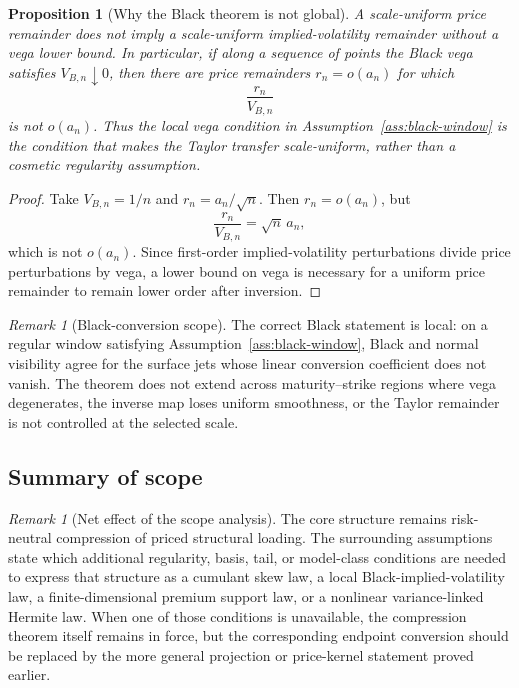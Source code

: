 \documentclass[11pt,a4paper]{amsart}
\theoremstyle{plain}
\newtheorem{proposition}[theorem]{Proposition}
\theoremstyle{definition}
\theoremstyle{remark}
\newtheorem{remark}[theorem]{Remark}
\begin{document}
\begin{proposition}[Why the Black theorem is not global]
\label{prop:black-not-global}
A scale-uniform price remainder does not imply a scale-uniform implied-volatility remainder without
a vega lower bound.  In particular, if along a sequence of points the Black vega satisfies
\(V_{B,n}\downarrow0\), then there are price remainders \(r_n=o(a_n)\) for which
\[
        \frac{r_n}{V_{B,n}}
\]
is not \(o(a_n)\).  Thus the local vega condition in Assumption~\ref{ass:black-window} is the
condition that makes the Taylor transfer scale-uniform, rather than a cosmetic regularity
assumption.
\end{proposition}

\begin{proof}
Take \(V_{B,n}=1/n\) and \(r_n=a_n/\sqrt n\).  Then \(r_n=o(a_n)\), but
\[
        \frac{r_n}{V_{B,n}}=\sqrt n\,a_n,
\]
which is not \(o(a_n)\).  Since first-order implied-volatility perturbations divide price
perturbations by vega, a lower bound on vega is necessary for a uniform price remainder to remain
lower order after inversion.
\end{proof}

\begin{remark}[Black-conversion scope]
\label{rem:black-conversion-scope-developed}
The correct Black statement is local: on a regular window satisfying Assumption~\ref{ass:black-window}, Black and normal visibility
agree for the surface jets whose linear conversion coefficient does not vanish.  The theorem does
not extend across maturity--strike regions where vega degenerates, the inverse map loses uniform
smoothness, or the Taylor remainder is not controlled at the selected scale.
\end{remark}

\subsection{Summary of scope}

\begin{remark}[Net effect of the scope analysis]
\label{rem:net-effect-weak-points}
The core structure remains risk-neutral compression of priced structural loading.  The surrounding
assumptions state which additional regularity, basis, tail, or model-class conditions are needed to
express that structure as a cumulant skew law, a local Black-implied-volatility law, a
finite-dimensional premium support law, or a nonlinear variance-linked Hermite law.  When one of
those conditions is unavailable, the compression theorem itself remains in force, but the
corresponding endpoint conversion should be replaced by the more general projection or price-kernel
statement proved earlier.
\end{remark}
\end{document}
